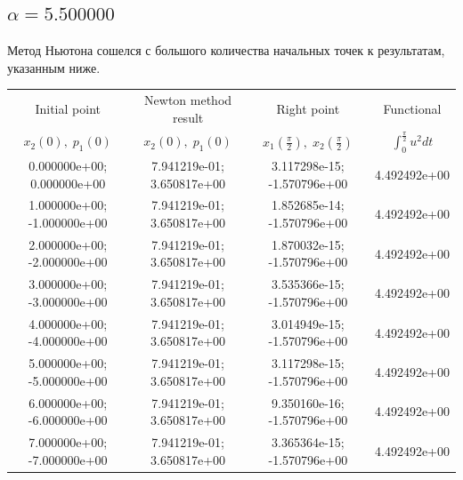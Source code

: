 \documentclass[titlepage]{article}
\def\l{\left}
\def\r{\right}
\begin{document}
\subsection{$\alpha = 5.500000$} 
Метод Ньютона сошелся с большого количества начальных точек к результатам, указанным ниже. \\ 
\begin{tabular}{ | c | c | c | c |} 
\hline 
Initial point  & Newton method result & Right point & Functional 
 \\ $x_2(0), \; p_1(0)$ & $x_2(0), \; p_1(0)$ & $x_1\l(\frac{\pi}{2}\r), \; x_2\l(\frac{\pi}{2}\r)$ & $\int_{0}^{\frac{\pi}{2}}u^2dt$  \\ \hline 
0.000000e+00; 0.000000e+00 & 7.941219e-01; 3.650817e+00 & 3.117298e-15; -1.570796e+00 & 4.492492e+00 \\ \hline 
1.000000e+00; -1.000000e+00 & 7.941219e-01; 3.650817e+00 & 1.852685e-14; -1.570796e+00 & 4.492492e+00 \\ \hline 
2.000000e+00; -2.000000e+00 & 7.941219e-01; 3.650817e+00 & 1.870032e-15; -1.570796e+00 & 4.492492e+00 \\ \hline 
3.000000e+00; -3.000000e+00 & 7.941219e-01; 3.650817e+00 & 3.535366e-15; -1.570796e+00 & 4.492492e+00 \\ \hline 
4.000000e+00; -4.000000e+00 & 7.941219e-01; 3.650817e+00 & 3.014949e-15; -1.570796e+00 & 4.492492e+00 \\ \hline 
5.000000e+00; -5.000000e+00 & 7.941219e-01; 3.650817e+00 & 3.117298e-15; -1.570796e+00 & 4.492492e+00 \\ \hline 
6.000000e+00; -6.000000e+00 & 7.941219e-01; 3.650817e+00 & 9.350160e-16; -1.570796e+00 & 4.492492e+00 \\ \hline 
7.000000e+00; -7.000000e+00 & 7.941219e-01; 3.650817e+00 & 3.365364e-15; -1.570796e+00 & 4.492492e+00 \\ \hline 
\end{tabular} 
\end{document}
